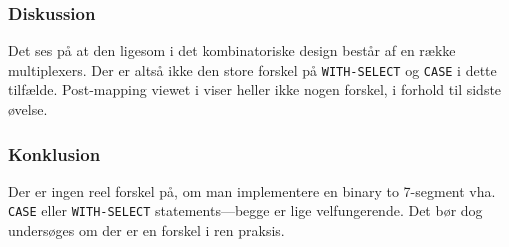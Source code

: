 {        

    \subsubsection{Diskussion}

    Det ses på  at den ligesom i det kombinatoriske design består af en række multiplexers.
    Der er altså ikke den store forskel på \texttt{WITH-SELECT} og \texttt{CASE} i dette tilfælde. Post-mapping viewet i  viser heller ikke nogen forskel, i forhold til sidste øvelse.

    \subsubsection{Konklusion}

    Der er ingen reel forskel på, om man implementere en binary to 7-segment vha. \texttt{CASE} eller \texttt{WITH-SELECT} statements---begge er lige velfungerende. Det bør dog undersøges om der er en forskel i ren praksis.
            
}